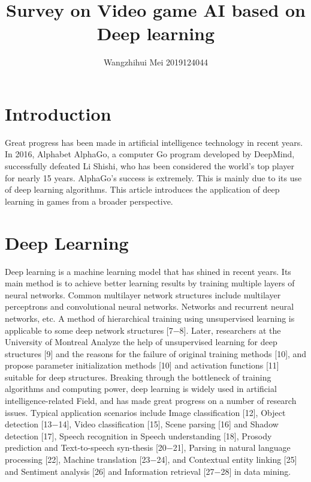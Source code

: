 \documentclass[11pt,en]{elegantpaper}
\title{Survey on Video game AI based on Deep learning}
\author{Wangzhihui Mei 2019124044}
\institute{CCNU-UOW JI}
\date{}
\begin{document}
\maketitle

\begin{abstract}

\end{abstract}


\section{Introduction}
Great progress has been made in artificial intelligence technology in recent years. In 2016, Alphabet AlphaGo, a computer Go program developed by DeepMind, successfully defeated Li Shishi, who has been considered the world's top player for nearly 15 years. AlphaGo's success is extremely. This is mainly due to its use of deep learning algorithms. This article introduces the application of deep learning in games from a broader perspective.
 
\section{Deep Learning}
Deep learning is a machine learning model that has shined in recent years. Its main method is to achieve better learning results by training multiple layers of neural networks. Common multilayer network structures include multilayer  perceptrons and convolutional neural networks. Networks and recurrent neural networks, etc. A method of hierarchical training using unsupervised learning is applicable to some deep network structures [7−8]. Later, researchers at the University of Montreal Analyze the help of unsupervised learning for deep structures [9] and the reasons for the failure of original training methods [10], and propose parameter initialization methods [10] and activation functions [11] suitable for deep structures. Breaking through the bottleneck of training algorithms and computing power, deep learning is widely used in artificial intelligence-related Field, and has made great progress on a number of research issues. Typical application scenarios include Image classification [12], Object detection [13−14], Video classification [15], Scene parsing [16] and Shadow detection [17], Speech recognition in Speech understanding [18], Prosody prediction and Text-to-speech syn-thesis [20−21], Parsing in natural language processing [22], Machine translation [23−24], and Contextual entity linking [25] and Sentiment analysis [26] and Information retrieval [27−28] in data mining. 
\end{document}
